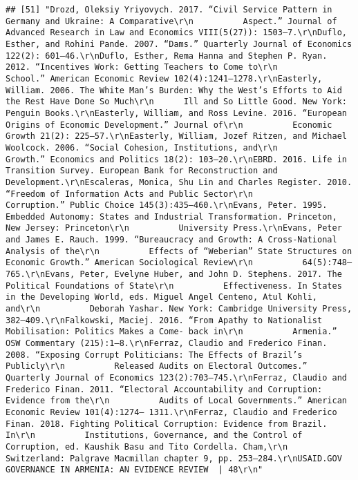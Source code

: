 \documentclass[
]{article}
\begin{document}
\begin{verbatim}
## [51] "Drozd, Oleksiy Yriyovych. 2017. “Civil Service Pattern in Germany and Ukraine: A Comparative\r\n          Aspect.” Journal of Advanced Research in Law and Economics VIII(5(27)): 1503–7.\r\nDuflo, Esther, and Rohini Pande. 2007. “Dams.” Quarterly Journal of Economics 122(2): 601–46.\r\nDuflo, Esther, Rema Hanna and Stephen P. Ryan. 2012. “Incentives Work: Getting Teachers to Come to\r\n          School.” American Economic Review 102(4):1241–1278.\r\nEasterly, William. 2006. The White Man’s Burden: Why the West’s Efforts to Aid the Rest Have Done So Much\r\n      Ill and So Little Good. New York: Penguin Books.\r\nEasterly, William, and Ross Levine. 2016. “European Origins of Economic Development.” Journal of\r\n          Economic Growth 21(2): 225–57.\r\nEasterly, William, Jozef Ritzen, and Michael Woolcock. 2006. “Social Cohesion, Institutions, and\r\n          Growth.” Economics and Politics 18(2): 103–20.\r\nEBRD. 2016. Life in Transition Survey. European Bank for Reconstruction and Development.\r\nEscaleras, Monica, Shu Lin and Charles Register. 2010. “Freedom of Information Acts and Public Sector\r\n          Corruption.” Public Choice 145(3):435–460.\r\nEvans, Peter. 1995. Embedded Autonomy: States and Industrial Transformation. Princeton, New Jersey: Princeton\r\n          University Press.\r\nEvans, Peter and James E. Rauch. 1999. “Bureaucracy and Growth: A Cross-National Analysis of the\r\n          Effects of “Weberian” State Structures on Economic Growth.” American Sociological Review\r\n          64(5):748–765.\r\nEvans, Peter, Evelyne Huber, and John D. Stephens. 2017. The Political Foundations of State\r\n          Effectiveness. In States in the Developing World, eds. Miguel Angel Centeno, Atul Kohli, and\r\n          Deborah Yashar. New York: Cambridge University Press, 382–409.\r\nFalkowski, Maciej. 2016. “From Apathy to Nationalist Mobilisation: Politics Makes a Come- back in\r\n          Armenia.” OSW Commentary (215):1–8.\r\nFerraz, Claudio and Frederico Finan. 2008. “Exposing Corrupt Politicians: The Effects of Brazil’s Publicly\r\n          Released Audits on Electoral Outcomes.” Quarterly Journal of Economics 123(2):703–745.\r\nFerraz, Claudio and Frederico Finan. 2011. “Electoral Accountability and Corruption: Evidence from the\r\n          Audits of Local Governments.” American Economic Review 101(4):1274– 1311.\r\nFerraz, Claudio and Frederico Finan. 2018. Fighting Political Corruption: Evidence from Brazil. In\r\n          Institutions, Governance, and the Control of Corruption, ed. Kaushik Basu and Tito Cordella. Cham,\r\n          Switzerland: Palgrave Macmillan chapter 9, pp. 253–284.\r\nUSAID.GOV                                                         GOVERNANCE IN ARMENIA: AN EVIDENCE REVIEW  | 48\r\n"                                                                                                                                                                                                                                                                                                                                                                                                                                                                                                                                                
\end{verbatim}
\end{document}
